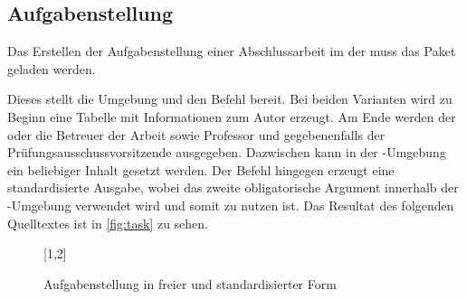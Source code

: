 \documentclass[%
  english,ngerman,%
  geometry=no,DIV=12,automark,%
]{tudscrartcl}
\begin{document}
\subsection{Aufgabenstellung}
\label{sec:task}
Das Erstellen der Aufgabenstellung einer Abschlussarbeit im \CD der \TnUD muss 
das Paket  geladen werden.
%
\begin{Preamble}
\usepackage{tudscrsupervisor}

\end{Preamble}
%
Dieses stellt die Umgebung  und den Befehl  
bereit. Bei beiden Varianten wird zu Beginn eine Tabelle mit Informationen zum 
Autor erzeugt. Am Ende werden der oder die Betreuer der Arbeit sowie Professor 
und gegebenenfalls der Prüfungsausschussvorsitzende ausgegeben. Dazwischen kann 
in der -Umgebung ein beliebiger Inhalt gesetzt werden. Der 
Befehl  hingegen erzeugt eine standardisierte Ausgabe, wobei 
das zweite obligatorische Argument innerhalb der -Umgebung 
verwendet wird und somit  zu nutzen ist. Das Resultat des folgenden 
Quelltextes ist in \autoref{fig:task} zu sehen. 
%
\begin{figure}
[1,2]
\caption{Aufgabenstellung in freier und standardisierter Form}
\label{fig:task}
\end{figure}
\end{document}
